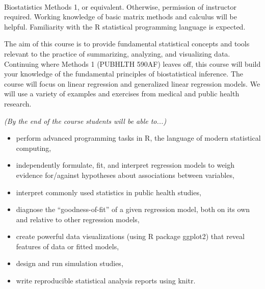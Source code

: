 \documentclass[10pt]{article}
\begin{document}
\bigskip
{}\\
Biostatistics Methods 1, or equivalent. Otherwise, permission of instructor required. Working knowledge of basic matrix methods and calculus will be helpful. Familiarity with the R statistical programming language is expected.




\bigskip
{}

 The aim of this course is to provide fundamental statistical concepts and tools relevant to the practice of summarizing, analyzing, and visualizing data. Continuing where Methods 1 (PUBHLTH 590AF) leaves off, this course will build your knowledge of the fundamental principles of biostatistical inference.  The course will focus on linear regression and generalized linear regression models. We will use a variety of examples and exercises from medical and public health research. %


\bigskip
{} {\em (By the end of the course students will be able to...)}

\begin{itemize}
\item perform advanced programming tasks in R, the language of modern statistical computing,
\item independently formulate, fit, and interpret regression models to weigh evidence for/against hypotheses about associations between variables, 
\item interpret commonly used statistics in public health studies,
\item diagnose the ``goodness-of-fit'' of a given regression model, both on its own and relative to other regression models,
\item create powerful data visualizations (using R package ggplot2) that reveal features of data or fitted models,
\item design and run simulation studies, 
\item write reproducible statistical analysis reports using knitr.
\end{itemize}
    
\end{document}
